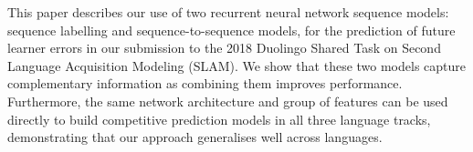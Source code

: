 This paper describes our use of two recurrent neural network sequence models: sequence labelling and sequence-to-sequence models, for the prediction of future learner errors in our submission to the 2018 Duolingo Shared Task on Second Language Acquisition Modeling (SLAM). We show that these two models capture complementary information as combining them improves performance. Furthermore, the same network architecture and group of features can be used directly to build competitive prediction models in all three language tracks, demonstrating that our approach generalises well across languages.
